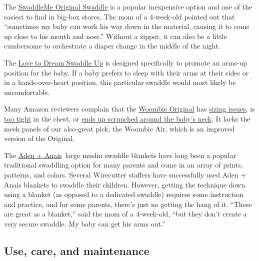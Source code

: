 The
\href{https://www.nytimes3xbfgragh.onion/wirecutter/out/link/30695/150986/4/86644/?merchant=Amazon}{SwaddleMe
Original Swaddle} is a popular inexpensive option and one of the easiest
to find in big-box stores. The mom of a 4-week-old pointed out that
``sometimes my baby can work his way down in the material, causing it to
come up close to his mouth and nose.'' Without a zipper, it can also be
a little cumbersome to orchestrate a diaper change in the middle of the
night.

The
\href{https://www.nytimes3xbfgragh.onion/wirecutter/out/link/30691/150982/4/86640/?merchant=Amazon}{Love
to Dream Swaddle Up} is designed specifically to promote an arms-up
position for the baby. If a baby prefers to sleep with their arms at
their sides or in a hands-over-heart position, this particular swaddle
would most likely be uncomfortable.

Many Amazon reviewers complain that the
\href{https://www.nytimes3xbfgragh.onion/wirecutter/out/link/30697/150988/4/86645/?merchant=Amazon}{Woombie
Original} has
\href{https://www.amazon.com/gp/customer-reviews/RD071FMDZ5DBM?tag=thewire06-20\&linkCode=xm2\&ascsubtag=YT78495}{sizing
issues}, is
\href{https://www.amazon.com/gp/customer-reviews/R2F5UKG8XIB19Q?tag=thewire06-20\&linkCode=xm2\&ascsubtag=YT78495}{too
tight} in the chest, or
\href{https://www.amazon.com/gp/customer-reviews/R19O6L27KWRQXP?tag=thewire06-20\&linkCode=xm2\&ascsubtag=YT78495}{ends
up scrunched around the baby's neck}. It lacks the mesh panels of our
also-great pick, the Woombie Air, which is an improved version of the
Original.

The
\href{https://www.nytimes3xbfgragh.onion/wirecutter/out/link/30689/150980/4/86638/?merchant=Amazon}{Aden
+ Anais}~large muslin swaddle blankets have long been a popular
traditional swaddling option for many parents and come in an array of
prints, patterns, and colors. Several Wirecutter staffers have
successfully used Aden + Anais blankets to swaddle their children.
However, getting the technique down using a blanket (as opposed to a
dedicated swaddle) requires some instruction and practice, and for some
parents, there's just no getting the hang of it. ``These are great as a
blanket,'' said the mom of a 4-week-old, ``but they don't create a very
secure swaddle. My baby can get his arms out.''

\hypertarget{use-care-and-maintenance}{%
\subsection{Use, care, and maintenance}\label{use-care-and-maintenance}}

